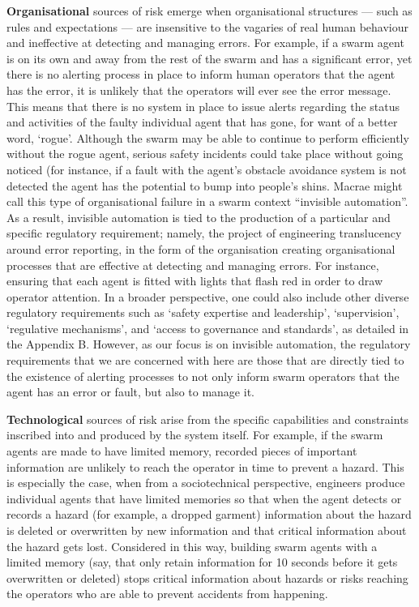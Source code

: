 \documentclass[lettersize,journal]{IEEEtran}
\begin{document}
\textbf{Organisational} sources of risk emerge when organisational structures — such as rules and expectations — are insensitive to the vagaries of real human behaviour and ineffective at detecting and managing errors. For example, if a swarm agent is on its own and away from the rest of the swarm and has a significant error, yet there is no alerting process in place to inform human operators that the agent has the error, it is unlikely that the operators will ever see the error message. This means that there is no system in place to issue alerts regarding the status and activities of the faulty individual agent that has gone, for want of a better word, `rogue’. Although the swarm may be able to continue to perform efficiently without the rogue agent, serious safety incidents could take place without going noticed (for instance, if a fault with the agent’s obstacle avoidance system is not detected the agent has the potential to bump into people’s shins. Macrae \cite{macrae2021learning} might call this type of organisational failure in a swarm context ``invisible automation”. As a result, invisible automation is tied to the production of a particular and specific regulatory requirement; namely, the project of engineering translucency around error reporting, in the form of the organisation creating organisational processes that are effective at detecting and managing errors. For instance, ensuring that each agent is fitted with lights that flash red in order to draw operator attention. In a broader perspective, one could also include other diverse regulatory requirements such as `safety expertise and leadership’, `supervision’, `regulative mechanisms’, and `access to governance and standards', as detailed in the Appendix B. However, as our focus is on invisible automation, the regulatory requirements that we are concerned with here are those that are directly tied to the existence of alerting processes to not only inform swarm operators that the agent has an error or fault, but also to manage it.

\textbf{Technological} sources of risk arise from the specific capabilities and constraints inscribed into and produced by the system itself. For example, if the swarm agents are made to have limited memory, recorded pieces of important information are unlikely to reach the operator in time to prevent a hazard. This is especially the case, when from a sociotechnical perspective, engineers produce individual agents that have limited memories so that when the agent detects or records a hazard (for example, a dropped garment) information about the hazard is deleted or overwritten by new information and that critical information about the hazard gets lost. Considered in this way, building swarm agents with a limited memory (say, that only retain information for 10 seconds before it gets overwritten or deleted) stops critical information about hazards or risks reaching the operators who are able to prevent accidents from happening. 
\end{document}
